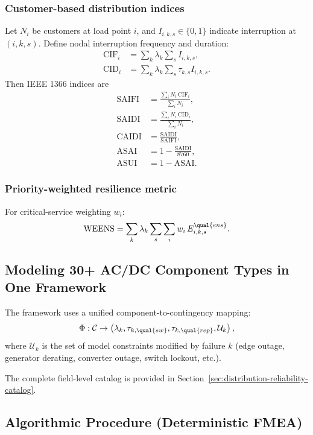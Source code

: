 \subsubsection{Customer-based distribution indices}
Let \(N_i\) be customers at load point \(i\), and
\(I_{i,k,s}\in\{0,1\}\) indicate interruption at \((i,k,s)\).
Define nodal interruption frequency and duration:
\begin{align}
\text{CIF}_i &= \sum_{k} \lambda_k \sum_s I_{i,k,s}, \\
\text{CID}_i &= \sum_{k} \lambda_k \sum_s \tau_{k,s} I_{i,k,s}.
\end{align}
Then IEEE 1366 indices are
\begin{align}
\text{SAIFI} &= \frac{\sum_i N_i\,\text{CIF}_i}{\sum_i N_i}, \\
\text{SAIDI} &= \frac{\sum_i N_i\,\text{CID}_i}{\sum_i N_i}, \\
\text{CAIDI} &= \frac{\text{SAIDI}}{\text{SAIFI}}, \\
\text{ASAI} &= 1 - \frac{\text{SAIDI}}{8760}, \\
\text{ASUI} &= 1 - \text{ASAI}.
\end{align}

\subsubsection{Priority-weighted resilience metric}
For critical-service weighting \(w_i\):
\begin{align}
\text{WEENS} = \sum_k \lambda_k \sum_s \sum_i
w_i\,E^{\qual{ens}}_{i,k,s}.
\end{align}

\subsection{Modeling 30+ AC/DC Component Types in One Framework}

The framework uses a unified component-to-contingency mapping:
\begin{align}
\Phi: \mathcal{C} \rightarrow
\left(\lambda_k,\tau_{k,\qual{sw}},\tau_{k,\qual{rep}},\mathcal{U}_k\right),
\end{align}
where \(\mathcal{U}_k\) is the set of model constraints modified by failure \(k\)
(edge outage, generator derating, converter outage, switch lockout, etc.).

The complete field-level catalog is provided in
Section~\ref{sec:distribution-reliability-catalog}.

\subsection{Algorithmic Procedure (Deterministic FMEA)}

